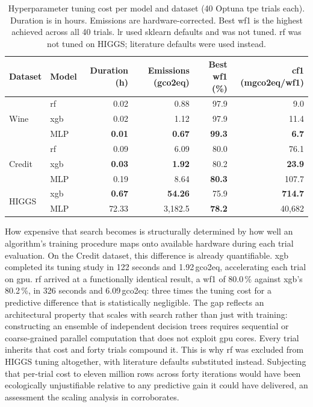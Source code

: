 \begin{table}[htbp]
\centering
\caption[Tuning cost per model and dataset.]{Hyperparameter tuning cost per model and dataset (40 Optuna \gls{tpe} trials each). Duration is in hours. Emissions are hardware-corrected. Best \gls{wf1} is the highest achieved across all 40 trials. \gls{lr} used sklearn defaults and was not tuned. \gls{rf} was not tuned on HIGGS; literature defaults were used instead.}
\label{tab:tuning_costs}
\small
\begin{tabular}{@{} l l r r r r @{}}
\toprule
Dataset & Model & Duration (h) & Emissions (\gls{gco2eq}) & Best \gls{wf1} (\%) & \gls{cf1} (\gls{mgco2eq}/\gls{wf1}) \\
\midrule
\multirow{3}{*}{Wine}   & \gls{rf}  &          0.02 &          0.88 & 97.9          &          9.0 \\
                         & \gls{xgb} &          0.02 &          1.12 & 97.9          &         11.4 \\
                         & MLP       & \textbf{0.01} & \textbf{0.67} & \textbf{99.3} & \textbf{6.7} \\
\midrule
\multirow{3}{*}{Credit} & \gls{rf}  &          0.09 &          6.09 & 80.0          &         76.1 \\
                         & \gls{xgb} & \textbf{0.03} & \textbf{1.92} & 80.2          & \textbf{23.9} \\
                         & MLP       &          0.19 &          8.64 & \textbf{80.3} &        107.7 \\
\midrule
\multirow{2}{*}{HIGGS}  & \gls{xgb} & \textbf{0.67} & \textbf{54.26} & 75.9          & \textbf{714.7} \\
                         & MLP       &         72.33 & 3{,}182.5      & \textbf{78.2} & 40{,}682 \\
\bottomrule
\end{tabular}
\end{table}

How expensive that search becomes is structurally determined by how well an algorithm's training procedure maps onto available hardware during each trial evaluation. On the Credit dataset, this difference is already quantifiable. \gls{xgb} completed its tuning study in 122 seconds and 1.92\,\gls{gco2eq}, accelerating each trial on \gls{gpu}. \gls{rf} arrived at a functionally identical result, a \gls{wf1} of 80.0\,\% against \gls{xgb}'s 80.2\,\%, in 326 seconds and 6.09\,\gls{gco2eq}: three times the tuning cost for a predictive difference that is statistically negligible. The gap reflects an architectural property that scales with search rather than just with training: constructing an ensemble of independent decision trees requires sequential or coarse-grained parallel computation that does not exploit \gls{gpu} cores. Every trial inherits that cost and forty trials compound it. This is why \gls{rf} was excluded from HIGGS tuning altogether, with literature defaults substituted instead. Subjecting that per-trial cost to eleven million rows across forty iterations would have been ecologically unjustifiable relative to any predictive gain it could have delivered, an assessment the scaling analysis in  corroborates.

